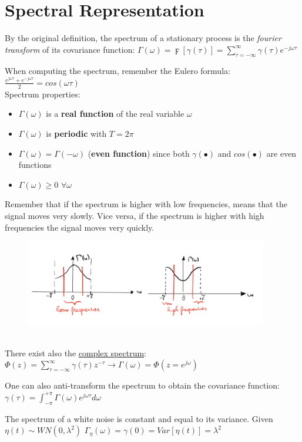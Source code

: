 \documentclass[10pt,a4paper]{article}
\begin{document}
\section{Spectral Representation}
By the original definition, the spectrum of a stationary process is the \textit{fourier transform} of its covariance function:
\center
 $\Gamma(\omega)=\digamma[\gamma(\tau)]=\sum_{\tau=-\infty}^{\infty} \gamma(\tau)e^{-j \omega \tau}$
 \\
 \vspace{0.5em}
 \raggedright
 When computing the spectrum, remember the Eulero formula:
 $\frac{e^{j \omega \tau}+e^{-j \omega \tau}}{2} = cos(\omega \tau)$
 \\
 Spectrum properties:
 \begin{itemize}
 	\item $\Gamma(\omega)$ is a \textbf{real function} of the real variable $\omega$
 	\item $\Gamma(\omega)$ is \textbf{periodic} with $T=2 \pi$
 	\item $\Gamma(\omega) =\Gamma(-\omega)$ (\textbf{even function}) since both $\gamma(\bullet)$ and $cos(\bullet)$ are even functions
 	\item $\Gamma(\omega) \geq 0$  $\forall \omega$
 \end{itemize}
 Remember that if the spectrum is higher with low frequencies, means that the signal moves very slowly. Vice versa, if the spectrum is higher with high frequencies the signal moves very quickly. 
 \begin{figure}[h!]
 \hfill \includegraphics[width=300pt]{images/spectrum.png}\hspace*{\fill}
  \label{fig:spectrum}
\end{figure} \\
 There exist also the \uline{complex spectrum}:
 \center
 $\Phi (z)=\sum_{\tau=-\infty}^{\infty} \gamma (\tau)z^{-\tau} \rightarrow \Gamma(\omega)=\Phi(z=e^{j \omega})$
 \\
 \raggedright
 \vspace{0.5em}
 One can also anti-transform the spectrum to obtain the covariance function:
  \center
 $\gamma(\tau)=\int_{-\pi}^{+\pi} \Gamma(\omega)e^{j \omega \tau} d\omega$
 \\
 \vspace{0.5em}
 \raggedright
  The spectrum of a white noise is constant and equal to its variance.
 Given  $\eta(t) \sim WN(0,\lambda^2)$
 \center 
$\Gamma_\eta(\omega) = \gamma(0) = Var[\eta(t)] = \lambda^2$
\\
\raggedright
\end{document}
